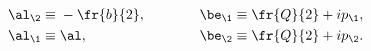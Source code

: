 \begin{equation}
\begin{aligned}
\al_\2\equiv& \;-\fr{b}{2},\\
\al_\1\equiv& \;\al,
\end{aligned}\qquad\qquad
\begin{aligned}
\be_\1\equiv& \;\fr{Q}{2}+ip_\1,\\
\be_\2\equiv& \;\fr{Q}{2}+ip_\2 .
\end{aligned}
\end{equation}

